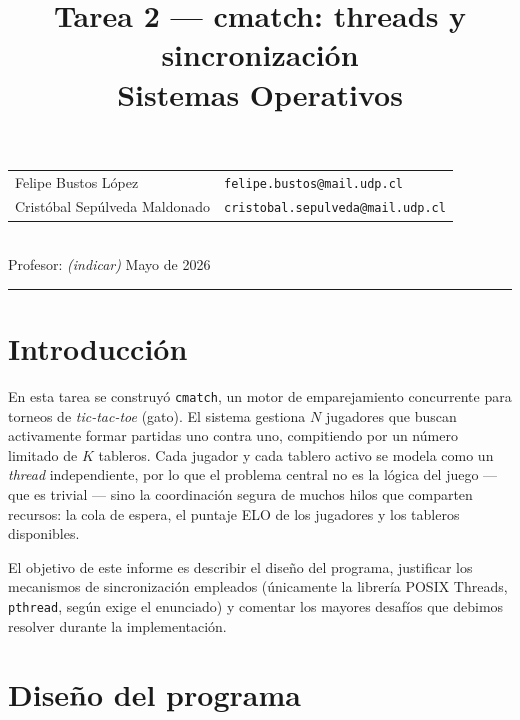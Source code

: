 \documentclass[11pt]{article}
\title{\vspace{-1.5em}\textbf{Tarea 2 --- cmatch: threads y sincronización}\\[0.2em]
\large Sistemas Operativos}
\date{}
\begin{document}
\maketitle
\vspace{-3em}
\begin{center}
\begin{tabular}{ll}
Felipe Bustos López & \texttt{felipe.bustos@mail.udp.cl} \\
Cristóbal Sepúlveda Maldonado & \texttt{cristobal.sepulveda@mail.udp.cl} \\
\end{tabular}\\[0.4em]
Profesor: \textit{(indicar)} \hspace{2em} Mayo de 2026
\end{center}

\hrule
\vspace{0.6em}

\section{Introducción}

En esta tarea se construyó \texttt{cmatch}, un motor de emparejamiento
concurrente para torneos de \emph{tic-tac-toe} (gato). El sistema gestiona $N$
jugadores que buscan activamente formar partidas uno contra uno, compitiendo por
un número limitado de $K$ tableros. Cada jugador y cada tablero activo se modela
como un \emph{thread} independiente, por lo que el problema central no es la
lógica del juego --- que es trivial --- sino la coordinación segura de muchos
hilos que comparten recursos: la cola de espera, el puntaje ELO de los jugadores
y los tableros disponibles.

El objetivo de este informe es describir el diseño del programa, justificar los
mecanismos de sincronización empleados (únicamente la librería POSIX Threads,
\texttt{pthread}, según exige el enunciado) y comentar los mayores desafíos que
debimos resolver durante la implementación.

\section{Diseño del programa}
\end{document}
